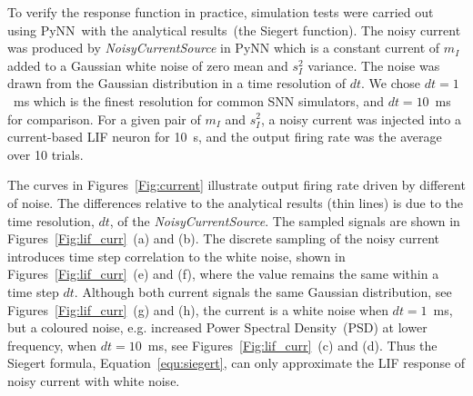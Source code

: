 	To verify the response function in practice, simulation tests were carried out using PyNN~\DIFdelbegin {}\DIFdelend \DIFaddbegin {}\DIFaddend with the analytical results~(the Siegert function).
	The noisy current was produced by \textit{NoisyCurrentSource} in PyNN which is a constant current of $m_I$ added to a Gaussian white noise of zero mean and $s_I^2$ variance.
	The noise was drawn from the Gaussian distribution in a time resolution of $dt$.
	We chose $dt=1$~ms which is the finest resolution for common SNN simulators, and $dt=10$~ms for comparison.
	For a given pair of $m_I$ and $s_I^2$, a noisy current was injected into a current-based LIF neuron for 10~s, and the output firing rate was the average over 10 trials.

	The curves in Figures~\ref{Fig:current} illustrate \DIFaddbegin {}\DIFaddend output firing rate driven by different \DIFdelbegin {}\DIFdelend \DIFaddbegin {}\DIFaddend of noise.
	The differences relative to the analytical results (thin lines) is due to the time resolution, $dt$, of the \textit{NoisyCurrentSource}.
	The sampled signals are shown in Figures~\ref{Fig:lif_curr}~(a) and (b).
	The discrete sampling of the noisy current introduces time step correlation to the white noise, shown in Figures~\ref{Fig:lif_curr}~(e) and (f), where the value remains the same within a time step $dt$.
	Although both current signals \DIFdelbegin {}\DIFdelend \DIFaddbegin {}\DIFaddend the same Gaussian distribution, see Figures~\ref{Fig:lif_curr}~(g) and (h), the current is a white noise when $dt=1$~ms, but a coloured noise, e.g. increased Power Spectral Density~(PSD) at lower frequency, when $dt=10$~ms, see Figures~\ref{Fig:lif_curr}~(c) and (d).
	Thus the Siegert formula, Equation~\ref{equ:siegert}, can only approximate the LIF response of noisy current with white noise.



